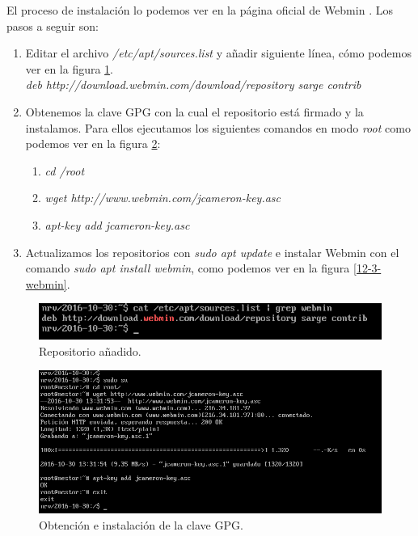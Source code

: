 \documentclass[a4paper,titlepage,12pt]{scrartcl}	%
\numberwithin{figure}{section} %
\numberwithin{table}{section} %
\begin{document}
	El proceso de instalación lo podemos ver en la página oficial de Webmin \cite{webmin}. Los pasos a seguir son:
	\begin{enumerate}
		\item Editar el archivo \textit{/etc/apt/sources.list} y añadir siguiente línea, cómo podemos ver en la figura \ref{12-1-webmin}.\\
		\textit{deb http://download.webmin.com/download/repository sarge contrib}
		\item Obtenemos la clave GPG con la cual el repositorio está firmado y la instalamos. Para ellos ejecutamos los siguientes comandos en modo \textit{root} como podemos ver en la figura \ref{12-2-webmin}:
		\begin{enumerate}
			\item \textit{cd /root}
			\item \textit{wget http://www.webmin.com/jcameron-key.asc}
			\item \textit{apt-key add jcameron-key.asc}
		\end{enumerate}
		
		\item Actualizamos los repositorios con \textit{sudo apt update} e instalar Webmin con el comando \textit{sudo apt install webmin}, como podemos ver en la figura  \ref{12-3-webmin}.
	\end{enumerate}
	
	\begin{figure}[H]
		\includegraphics[width=\linewidth]{./Imagenes/12-1-webmin.png}
		\vspace{-0.5cm}
		\caption[Repositorio añadido.]{Repositorio añadido.}
		\label{12-1-webmin}
	\end{figure}
	
	\begin{figure}[H]
		\centering
		\includegraphics[scale=0.55]{./Imagenes/12-2-webmin.png}
		\caption[Obtención e instalación de la clave GPG.]{Obtención e instalación de la clave GPG.}
		\label{12-2-webmin}
	\end{figure}
	
\end{document}
